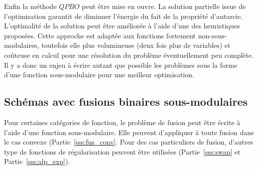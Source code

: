 \documentclass[../main/These_Mathias_Paget.tex]{subfiles}
\begin{document}
	Enfin la méthode $QPBO$ peut être mise en ouvre. La solution partielle issue de l'optimisation garantit de diminuer l’énergie du fait de la propriété d'autarcie. L'optimalité de la solution peut être améliorée à l'aide d'une des heuristiques proposées. Cette approche est adaptée aux fonctions fortement non-sous-modulaires, toutefois elle plus volumineuse (deux fois plus de variables) et coûteuse en calcul pour une résolution du problème éventuellement peu complète. Il y a donc un enjeu à écrire autant que possible les problèmes sous la forme d'une fonction sous-modulaire pour une meilleur optimisation.

\subsection{Schémas avec fusions binaires sous-modulaires}
\label{ss:s_mod_form}

Pour certaines catégories de fonction, le problème de fusion peut être écrite à l'aide d'une fonction sous-modulaire. Elle peuvent d'appliquer à toute fusion dans le cas convexe (Partie~\ref{sss:fus_conv}. Pour des cas particuliers de fusion, d'autres type de fonctions de régularisation peuvent être utilisées (Partie~\ref{sss:swap} et Partie~\ref{sss:alp_exp}).
\end{document}
